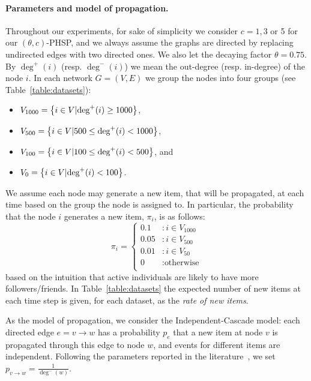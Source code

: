 \paragraph{\bf Parameters and model of propagation.}
Throughout our experiments, for sake of simplicity we consider $c=1,3$ or 5 for our $(\theta,c)$-PHSP, and we always assume the graphs are directed by replacing undirected edges with two directed ones. We also let the decaying factor $\theta = 0.75$. By $\deg^+(i)$ (resp. $\deg^-(i)$) we mean the out-degree (resp. in-degree) of the node $i$. In each network $G=(V,E)$ we group the nodes into four groups (see Table~\ref{table:datasets}):
\begin{itemize}
 \item $V_{1000} = \left\{i\in V \vert \text{deg}^+(i) \geq 1000\right\}$,
 \item $V_{500}  = \left\{i\in V \vert 500\leq \text{deg}^+(i) < 1000\right\}$,
 \item $V_{100}  = \left\{i\in V \vert 100\leq \text{deg}^+(i) < 500\right\}$, and
 \item $V_{0}    = \left\{i\in V \vert \text{deg}^+(i) < 100\right\}$.
\end{itemize}
We assume each node may generate a new item, that will be propagated, at each time based on the group the node is assigned to. In particular, the probability that the node $i$ generates a new item, $\pi_i$, is as follows:
$$
   \pi_i = \left\{
     \begin{array}{ll}
       0.1 &: i \in V_{1000}\\
       0.05 &: i \in V_{500} \\       
       0.01 &: i \in V_{50} \\
       0 & : \text{otherwise} \\
     \end{array}
   \right.
$$
based on the intuition that active individuals are  likely to have more followers/friends. In Table~\ref{table:datasets} the expected number of new items at each time step is given, for each dataset, as the \emph{rate of new items}.




As the model of propagation, we consider the Independent-Cascade model\cite{Kempe2003}:  each directed edge $e=v\rightarrow w$ has a probability $p_e$ that a new item at node $v$ is propagated through this edge to node $w$, and events for different items are independent. Following the parameters reported in the literature~\cite{Kempe2003,Chen2009,Chen2010,jung2011irie,tang2014influence}, we set $p_{v\rightarrow w} = \frac{1}{\deg^-(w)}$.



